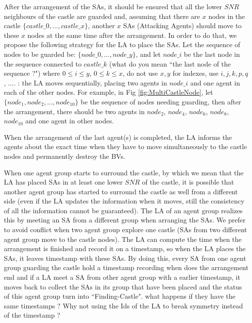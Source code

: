 After the arrangement of the SAs, it should be ensured that all the lower $SNR$ neighbours of the castle are guarded and, assuming that there are $x$ nodes in the castle $\{castle\_0, \ldots, castle\_x\}$, another $x$ SAs (Attacking Agents) should move to these $x$ nodes at the same time after the arrangement. In order to do that, we propose  the following strategy for the LA to place the SAs. 
Let  the sequence of   nodes  to be guarded be:
 $\{node\_0, \ldots, node\_y\}$, and  let $node\_i$ be the last node in the sequence connected to $castle\_k$ \color{blue} 
 (what do you mean ``the last node of the sequence ?") 
 \color{black} 
 where $0\leq i\leq y$, $0\leq k\leq x$,  
 \color{blue} do not use $x,y$ for indexes, use $i,j,k,p,q$, .... \color{black}:  the LA  moves sequentially, placing two agents in $node\_i$ and  one agent in each of the  other nodes.  
For example, in Fig \ref{fig:MultiCastleNode}, let  $\{node_1, node_2, \ldots, node_{10}\}$ be the sequence of nodes needing guarding, then after the arrangement, there should be two agents in $node_2$, $node_4$, $node_6$, $node_8$, $node_{10}$ and one agent in other nodes.

When   the arrangement of the last agent(s) is completed, the LA 
 informs the agents about the  exact time  when they have to move simultaneously  to the castle nodes and permanently destroy the BVs.

When one agent group starts to surround the castle, by which we mean that the LA has placed SAs in at least one lower $SNR$ of the castle, it is possible that another agent group has started to surround the castle  as well from a different side 
(even if the LA updates the information when it moves, still the consistency of all the information cannot be guaranteed). The LA of an agent group realizes this by meeting an SA  from a different group when   arranging
 the SAs.
 We prefer to avoid conflict when two agent group explore one castle (SAs from two different agent group move to the castle nodes). The LA can compute the time when the arrangement is finished and record it on a timestamp, so when the LA places the SAs, it leaves timestamp with these SAs. By doing this, every SA from one agent group guarding the castle hold a timestamp recording when does the arrangement end and if a LA meet a SA from other agent group with a earlier timestamp, it moves back to collect the SAs in its group that have been placed and the status of this agent group turn into ``Finding-Castle".  \color{blue} what happens if they have the same timestamps ? Why not using the Ids of the LA to break symmetry instead of the timestamp ? \color{black}

